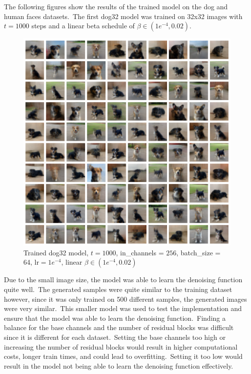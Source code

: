 \documentclass[12pt]{article}
\begin{document}
The following figures show the results of the trained model on the dog and human faces datasets.\
The first dog32 model was trained on 32x32 images with $t=1000$ steps and a linear beta schedule of $\beta \in(1e^{-4}, 0.02)$.\

\begin{figure}[H]
  \centering
  \includegraphics[width=1\textwidth]{dog32.png}
  \caption{Trained dog32 model, $t=1000$, in\_channels = $256$, batch\_size = 64, lr$=1e^{-4}$, linear $\beta \in(1e^{-4}, 0.02)$}
\end{figure}

Due to the small image size, the model was able to learn the denoising function quite well.\
The generated samples were quite similar to the training dataset however, since it was only trained on 500 different samples, the generated images were very similar.\
This smaller model was used to test the implementation and ensure that the model was able to learn the denoising function.\
Finding a balance for the base channels and the number of residual blocks was difficult since it is different for each dataset.\
Setting the base channels too high or increasing the number of residual blocks would result in higher computational costs, longer train times, and could lead to overfitting.\
Setting it too low would result in the model not being able to learn the denoising function effectively.\\
\end{document}
